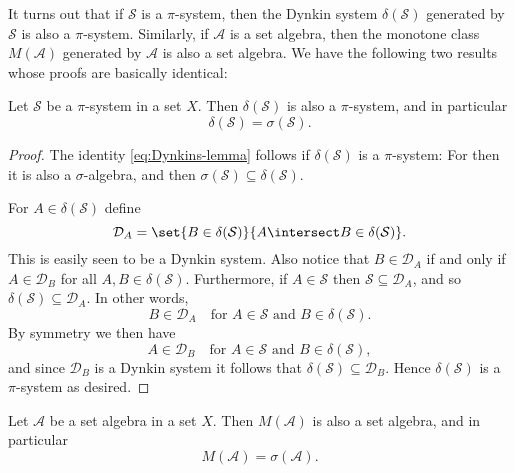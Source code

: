 \documentclass[article, a4paper, 11pt, oneside]{memoir}
\numberwithin{equation}{chapter}
\newcommand{\calD}{\mathcal{D}}
\newcommand{\calA}{\mathcal{A}}
\newcommand{\calS}{\mathcal{S}}
\begin{document}
It turns out that if $\calS$ is a $\pi$-system, then the Dynkin system $\delta(\calS)$ generated by $\calS$ is also a $\pi$-system. Similarly, if $\calA$ is a set algebra, then the monotone class $M(\calA)$ generated by $\calA$ is also a set algebra. We have the following two results whose proofs are basically identical:

\begin{theorem}
    Let $\calS$ be a $\pi$-system in a set $X$. Then $\delta(\calS)$ is also a $\pi$-system, and in particular
    \begin{equation}
        \label{eq:Dynkins-lemma}
        \delta(\calS) = \sigma(\calS).
    \end{equation}
\end{theorem}

\begin{proof}
    The identity \cref{eq:Dynkins-lemma} follows if $\delta(\calS)$ is a $\pi$-system: For then it is also a $\sigma$-algebra, and then $\sigma(\calS) \subseteq \delta(\calS)$.

    For $A \in \delta(\calS)$ define
    \begin{equation*}
        \calD_A
            = \set{B \in \delta(\calS)}{A \intersect B \in \delta(\calS)}.
    \end{equation*}
    This is easily seen to be a Dynkin system. Also notice that $B \in \calD_A$ if and only if $A \in \calD_B$ for all $A,B \in \delta(\calS)$. Furthermore, if $A \in \calS$ then $\calS \subseteq \calD_A$, and so $\delta(\calS) \subseteq \calD_A$. In other words,
    \begin{equation*}
        B \in \calD_A
        \quad
        \text{for $A \in \calS$ and $B \in \delta(\calS)$}.
    \end{equation*}
    By symmetry we then have
    \begin{equation*}
        A \in \calD_B
        \quad
        \text{for $A \in \calS$ and $B \in \delta(\calS)$},
    \end{equation*}
    and since $\calD_B$ is a Dynkin system it follows that $\delta(\calS) \subseteq \calD_B$. Hence $\delta(\calS)$ is a $\pi$-system as desired.
\end{proof}


\begin{theorem}
    Let $\calA$ be a set algebra in a set $X$. Then $M(\calA)$ is also a set algebra, and in particular
    \begin{equation}
        \label{eq:monotone-class-lemma}
        M(\calA) = \sigma(\calA).
    \end{equation}
\end{theorem}
\end{document}
